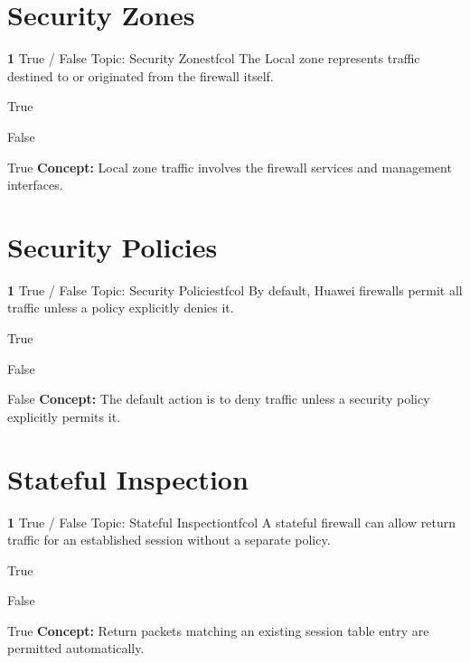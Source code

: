 \documentclass[10pt,a4paper]{article}
\begin{document}
\section{Security Zones}
\begin{qcard}{\color{white}\textbf{1} \hfill \small True / False \textbar{} Topic: Security Zones}{tfcol}
The Local zone represents traffic destined to or originated from the firewall itself.

\begin{qoptions}
\item True
\item False
\end{qoptions}
\begin{explainbox}{True}
\textbf{Concept:} Local zone traffic involves the firewall services and management interfaces.
\end{explainbox}
\end{qcard}

\section{Security Policies}
\begin{qcard}{\color{white}\textbf{1} \hfill \small True / False \textbar{} Topic: Security Policies}{tfcol}
By default, Huawei firewalls permit all traffic unless a policy explicitly denies it.

\begin{qoptions}
\item True
\item False
\end{qoptions}
\begin{explainbox}{False}
\textbf{Concept:} The default action is to deny traffic unless a security policy explicitly permits it.
\end{explainbox}
\end{qcard}

\section{Stateful Inspection}
\begin{qcard}{\color{white}\textbf{1} \hfill \small True / False \textbar{} Topic: Stateful Inspection}{tfcol}
A stateful firewall can allow return traffic for an established session without a separate policy.

\begin{qoptions}
\item True
\item False
\end{qoptions}
\begin{explainbox}{True}
\textbf{Concept:} Return packets matching an existing session table entry are permitted automatically.
\end{explainbox}
\end{qcard}
\end{document}
